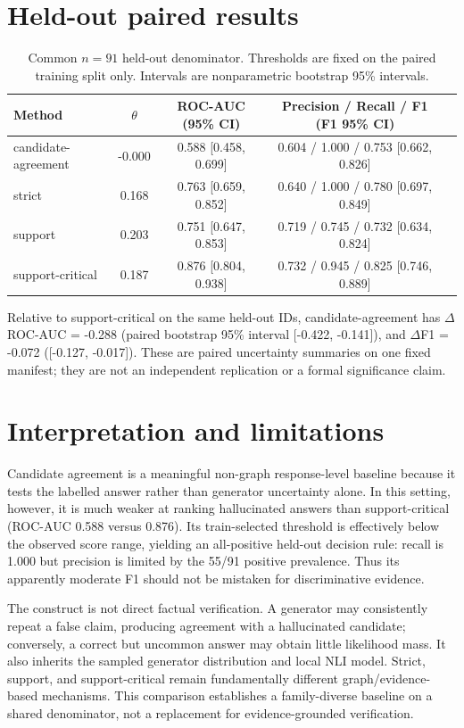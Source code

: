 \documentclass[11pt,a4paper]{article}
\begin{document}
\section{Held-out paired results}
\begin{table}[h]
\centering
\caption{Common $n=91$ held-out denominator.  Thresholds are fixed on the paired training split only.  Intervals are nonparametric bootstrap 95\% intervals.}
\small
\begin{tabular}{@{}lcccc@{}}
\toprule
Method & $\theta$ & ROC-AUC (95\% CI) & Precision / Recall / F1 (F1 95\% CI) \\
\midrule
candidate-agreement & -0.000 & 0.588 [0.458, 0.699] & 0.604 / 1.000 / 0.753 [0.662, 0.826] \\
strict & 0.168 & 0.763 [0.659, 0.852] & 0.640 / 1.000 / 0.780 [0.697, 0.849] \\
support & 0.203 & 0.751 [0.647, 0.853] & 0.719 / 0.745 / 0.732 [0.634, 0.824] \\
support-critical & 0.187 & 0.876 [0.804, 0.938] & 0.732 / 0.945 / 0.825 [0.746, 0.889] \\
\bottomrule
\end{tabular}
\end{table}

Relative to support-critical on the same held-out IDs, candidate-agreement has $\Delta$ROC-AUC = -0.288 (paired bootstrap 95\% interval [-0.422, -0.141]), and $\Delta$F1 = -0.072 ([-0.127, -0.017]).  These are paired uncertainty summaries on one fixed manifest; they are not an independent replication or a formal significance claim.

\section{Interpretation and limitations}
Candidate agreement is a meaningful non-graph response-level baseline because it tests the labelled answer rather than generator uncertainty alone.  In this setting, however, it is much weaker at ranking hallucinated answers than support-critical (ROC-AUC 0.588 versus 0.876).  Its train-selected threshold is effectively below the observed score range, yielding an all-positive held-out decision rule: recall is 1.000 but precision is limited by the 55/91 positive prevalence.  Thus its apparently moderate F1 should not be mistaken for discriminative evidence.

The construct is not direct factual verification.  A generator may consistently repeat a false claim, producing agreement with a hallucinated candidate; conversely, a correct but uncommon answer may obtain little likelihood mass.  It also inherits the sampled generator distribution and local NLI model.  Strict, support, and support-critical remain fundamentally different graph/evidence-based mechanisms.  This comparison establishes a family-diverse baseline on a shared denominator, not a replacement for evidence-grounded verification.
\end{document}
